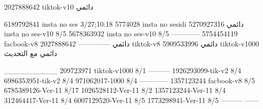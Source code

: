 2027888642 tiktok-v10
دائمي

6189792841 insta no ses
3/27;10:18
5774028 insta no sesidi
دائمي
5270927316 insta no ses-v10
8/5
5678363932 insta no ses-v10
8/5
------------
5754454119 facbook-v8
دائمي
--------------
2027888642 tiktok-v8
دائمي
5909533996 tiktok-v1000
دائمي مع التحديث

__________
209723971 tiktok-v1000
8/1
---------
1926293099-tik-v2
8/4
6986353951-tik-v2
8/4
971062017-1000
8/4
------------
1357123244 facbook-v8
8/5
6785389126-Ver-11
8/17
1026528112-Ver-11
8/2
1357123244-Ver-11
8/4
312464417-Ver-11
8/4
6007129520-Ver-11
8/5
1773298941-Ver-11
8/5
---------
------
